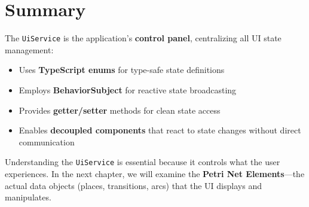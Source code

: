\section{Summary}
\label{sec:ui-summary}

The \texttt{UiService} is the application's \textbf{control panel}, centralizing all UI state management:

\begin{itemize}
    \item Uses \textbf{TypeScript enums} for type-safe state definitions
    \item Employs \textbf{BehaviorSubject} for reactive state broadcasting
    \item Provides \textbf{getter/setter} methods for clean state access
    \item Enables \textbf{decoupled components} that react to state changes without direct communication
\end{itemize}

Understanding the \texttt{UiService} is essential because it controls what the user experiences. In the next chapter, we will examine the \textbf{Petri Net Elements}---the actual data objects (places, transitions, arcs) that the UI displays and manipulates.
